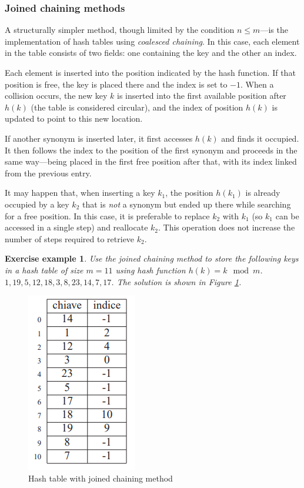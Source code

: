 \documentclass{report}
\newtheorem{es}{Exercise example}[chapter]
\begin{document}
\subsubsection{Joined chaining methods}
A structurally simpler method, though limited by the condition $n \leq m$—is the implementation of hash tables using \textit{coalesced chaining}. In this case, each element in the table consists of two fields: one containing the key and the other an index.

Each element is inserted into the position indicated by the hash function. If that position is free, the key is placed there and the index is set to $-1$. When a collision occurs, the new key $k$ is inserted into the first available position after $h(k)$ (the table is considered circular), and the index of position $h(k)$ is updated to point to this new location.

If another synonym is inserted later, it first accesses $h(k)$ and finds it occupied. It then follows the index to the position of the first synonym and proceeds in the same way—being placed in the first free position after that, with its index linked from the previous entry.

It may happen that, when inserting a key $k_1$, the position $h(k_1)$ is already occupied by a key $k_2$ that is \textit{not} a synonym but ended up there while searching for a free position. In this case, it is preferable to replace $k_2$ with $k_1$ (so $k_1$ can be accessed in a single step) and reallocate $k_2$. This operation does not increase the number of steps required to retrieve $k_2$.
\begin{es}
    Use the joined chaining method to store the following keys in a hash table of size \(m=11\) using hash function \(h(k) = k \mod m\). \( 1, 19, 5, 12, 18, 3, 8, 23, 14, 7, 17\). The solution is shown in Figure \ref{fig:hash_table2}.
\end{es}
\begin{figure}
    \centering
    \includegraphics[scale=1]{img/hash_unita.PNG}
    \caption{Hash table with joined chaining method}
    \label{fig:hash_table2}
\end{figure}
\end{document}
